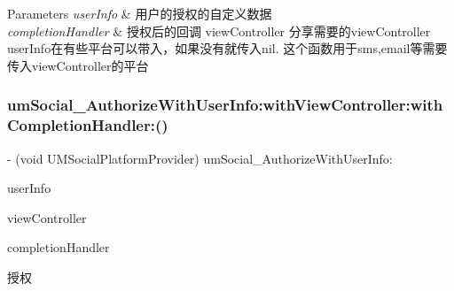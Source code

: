 \begin{DoxyParams}{Parameters}
{\em user\+Info} & 用户的授权的自定义数据 \\
\hline
{\em completion\+Handler} & 授权后的回调  view\+Controller 分享需要的view\+Controller  user\+Info在有些平台可以带入，如果没有就传入nil. 这个函数用于sms,email等需要传入view\+Controller的平台 \\
\hline
\end{DoxyParams}
\mbox{\label{protocol_u_m_social_platform_provider_01-p_a99c9538562ad13c437698eadbd8fe7c6}} 
\subsubsection{\texorpdfstring{um\+Social\+\_\+\+Authorize\+With\+User\+Info\+:with\+View\+Controller\+:with\+Completion\+Handler\+:()}{umSocial\_AuthorizeWithUserInfo:withViewController:withCompletionHandler:()}\hspace{0.1cm}{\footnotesize\ttfamily [2/2]}}
{\footnotesize\ttfamily -\/ (void U\+M\+Social\+Platform\+Provider) um\+Social\+\_\+\+Authorize\+With\+User\+Info\+: \begin{DoxyParamCaption}\item[{(N\+S\+Dictionary $\ast$)}]{user\+Info }\item[{withViewController:(U\+I\+View\+Controller $\ast$)}]{view\+Controller }\item[{withCompletionHandler:(U\+M\+Social\+Request\+Completion\+Handler)}]{completion\+Handler }\end{DoxyParamCaption}}

授权


